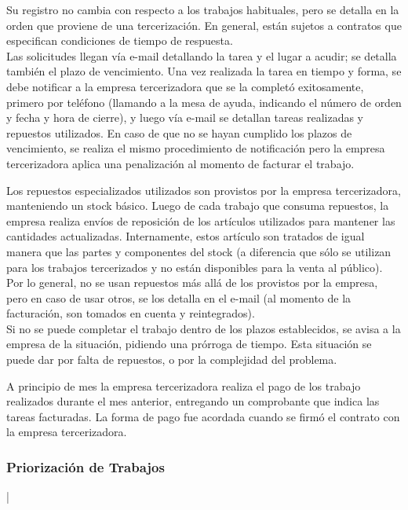 \documentclass[12pt]{extarticle}
\begin{document}
\begin{spacing}{1.2}
        Su registro no cambia con respecto a los trabajos habituales, pero se detalla en la orden que proviene de una tercerización.
        En general, están sujetos a contratos que especifican condiciones de tiempo de respuesta.\\

        Las solicitudes llegan vía e-mail detallando la tarea y el lugar a acudir; se detalla también el plazo de vencimiento.
        Una vez realizada la tarea en tiempo y forma, se debe notificar a la empresa tercerizadora que se la completó exitosamente, primero por teléfono (llamando a la mesa de ayuda, indicando el número de orden y fecha y hora de cierre), y luego vía e-mail se detallan tareas realizadas y repuestos utilizados.
        En caso de que no se hayan cumplido los plazos de vencimiento, se realiza el mismo procedimiento de notificación pero la empresa tercerizadora aplica una penalización al momento de facturar el trabajo.

        Los repuestos especializados utilizados son provistos por la empresa tercerizadora, manteniendo un stock básico. Luego de cada trabajo que consuma repuestos, la empresa realiza envíos de reposición de los artículos utilizados para mantener las cantidades actualizadas. 
        Internamente, estos artículo son tratados de igual manera que las partes y componentes del stock (a diferencia que sólo se utilizan para los trabajos tercerizados y no están disponibles para la venta al público).
        Por lo general, no se usan repuestos más allá de los provistos por la empresa, pero en caso de usar otros, se los detalla en el e-mail (al momento de la facturación, son tomados en cuenta y reintegrados).\\

        Si no se puede completar el trabajo dentro de los plazos establecidos, se avisa a la empresa de la situación, pidiendo una prórroga de tiempo. Esta situación se puede dar por falta de repuestos, o por la complejidad del problema.

        A principio de mes la empresa tercerizadora realiza el pago de los trabajo realizados durante el mes anterior, entregando un comprobante que indica las tareas facturadas. La forma de pago fue acordada cuando se firmó el contrato con la empresa tercerizadora.

        \subsubsection*{Priorización de Trabajos}|


\end{spacing}
\end{document}
